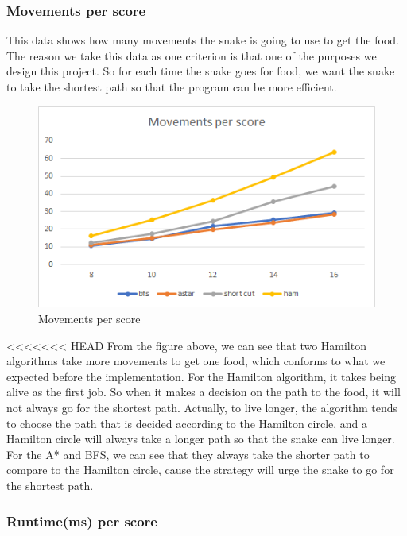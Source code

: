 \documentclass[12pt]{article}
\begin{document}
\subsubsection{Movements per score}
This data shows how many movements the snake is going to use to get the food. The reason 
we take this data as one criterion is that one of the purposes we design this project. So 
for each time the snake goes for food, we want the snake to take the shortest path so that 
the program can be more efficient. 

\begin{figure}[H]
    \centering 
    \includegraphics[scale = 0.9]{anay1.png}
    \caption{Movements per score}
\end{figure}

<<<<<<< HEAD
From the figure above, we can see that two Hamilton algorithms take more movements to get one 
food, which conforms to what we expected before the implementation. For the Hamilton algorithm, 
it takes being alive as the first job. So when it makes a decision on the path to the food, it 
will not always go for the shortest path. Actually, to live longer, the algorithm tends to 
choose the path that is decided according to the Hamilton circle, and a Hamilton circle will 
always take a longer path so that the snake can live longer. For the A* and BFS, we can see 
that they always take the shorter path to compare to the Hamilton circle, cause the strategy 
will urge the snake to go for the shortest path. 

\subsubsection{Runtime(ms) per score}
\end{document}
